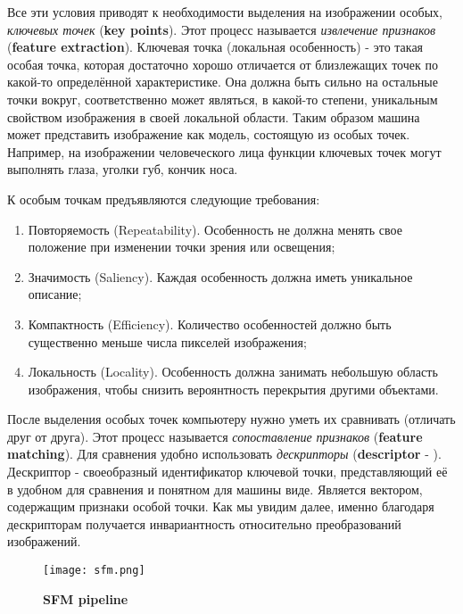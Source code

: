 Все эти условия приводят к необходимости выделения на изображении особых, \textit{ключевых точек} (\textbf{key points}). Этот процесс называется \textit{извлечение признаков} (\textbf{feature extraction}). Ключевая точка (локальная особенность) - это такая особая точка, которая достаточно хорошо отличается от близлежащих точек по какой-то определённой характеристике. Она должна быть сильно  на остальные точки вокруг, соответственно может являться, в какой-то степени, уникальным свойством изображения в своей локальной области. Таким образом машина может представить изображение как модель, состоящую из особых точек. Например, на изображении человеческого лица функции ключевых точек могут выполнять глаза, уголки губ, кончик носа.

\vspace{1em}
К особым точкам предъявляются следующие требования:
\begin{enumerate}
    \item Повторяемость (Repeatability). Особенность не должна менять свое положение при изменении точки зрения или освещения;
    \item Значимость (Saliency). Каждая особенность должна иметь уникальное описание;
    \item Компактность (Efficiency). Количество особенностей должно быть существенно меньше числа пикселей изображения;
    \item Локальность (Locality). Особенность должна занимать небольшую область изображения, чтобы снизить вероянтность перекрытия другими объектами.
\end{enumerate}

\vspace{1em}
После выделения особых точек компьютеру нужно уметь их сравнивать (отличать друг от друга). Этот процесс называется \textit{сопоставление признаков} (\textbf{feature matching}). Для сравнения удобно использовать \textit{дескрипторы} (\textbf{descriptor} - ). Дескриптор - своеобразный идентификатор ключевой точки, представляющий её в удобном для сравнения и понятном для машины виде. Является вектором, содержащим признаки особой точки. Как мы увидим далее, именно благодаря дескрипторам получается инвариантность относительно преобразований изображений.

\begin{figure}[h]
    \centering
    \texttt{[image: sfm.png]}
    \caption{\textbf{SFM pipeline}}
    \label{fig:sfm}
\end{figure}

